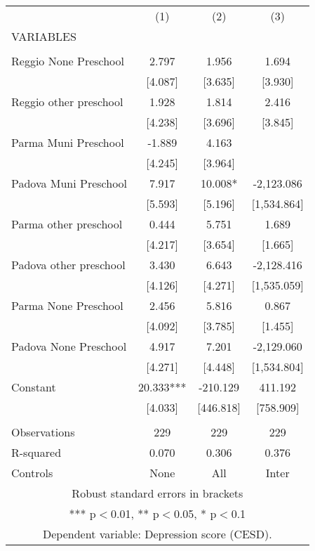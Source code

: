 \begin{tabular}{lccc} \hline
 & (1) & (2) & (3) \\
VARIABLES &  &  &  \\ \hline
 &  &  &  \\
Reggio None Preschool & 2.797 & 1.956 & 1.694 \\
 & [4.087] & [3.635] & [3.930] \\
Reggio other preschool & 1.928 & 1.814 & 2.416 \\
 & [4.238] & [3.696] & [3.845] \\
Parma Muni Preschool & -1.889 & 4.163 &  \\
 & [4.245] & [3.964] &  \\
Padova Muni Preschool & 7.917 & 10.008* & -2,123.086 \\
 & [5.593] & [5.196] & [1,534.864] \\
Parma other preschool & 0.444 & 5.751 & 1.689 \\
 & [4.217] & [3.654] & [1.665] \\
Padova other preschool & 3.430 & 6.643 & -2,128.416 \\
 & [4.126] & [4.271] & [1,535.059] \\
Parma None Preschool & 2.456 & 5.816 & 0.867 \\
 & [4.092] & [3.785] & [1.455] \\
Padova None Preschool & 4.917 & 7.201 & -2,129.060 \\
 & [4.271] & [4.448] & [1,534.804] \\
Constant & 20.333*** & -210.129 & 411.192 \\
 & [4.033] & [446.818] & [758.909] \\
 &  &  &  \\
Observations & 229 & 229 & 229 \\
R-squared & 0.070 & 0.306 & 0.376 \\
 Controls & None & All & Inter \\ \hline
\multicolumn{4}{c}{ Robust standard errors in brackets} \\
\multicolumn{4}{c}{ *** p$<$0.01, ** p$<$0.05, * p$<$0.1} \\
\multicolumn{4}{c}{ Dependent variable: Depression score (CESD).} \\
\end{tabular}
